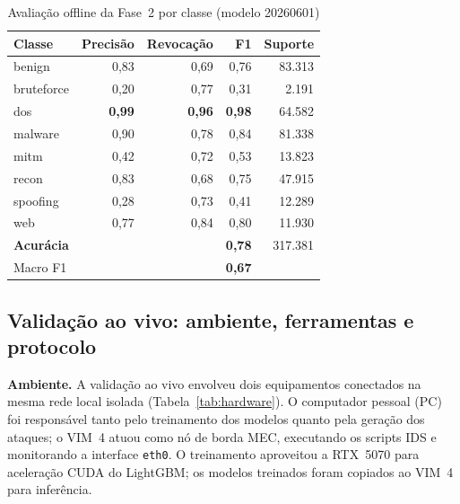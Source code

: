 \documentclass[12pt]{article}
\begin{document}
\begin{table}[ht]
\centering
\caption{Avaliação offline da Fase~2 por classe (modelo 20260601)}
\label{tab:phase2_offline}
\begin{tabular}{@{}lrrrr@{}}
\toprule
\textbf{Classe} & \textbf{Precisão} & \textbf{Revocação} & \textbf{F1} & \textbf{Suporte} \\ \midrule
benign      & 0,83 & 0,69 & 0,76 & 83.313 \\
bruteforce  & 0,20 & 0,77 & 0,31 &  2.191 \\
dos         & \textbf{0,99} & \textbf{0,96} & \textbf{0,98} & 64.582 \\
malware     & 0,90 & 0,78 & 0,84 & 81.338 \\
mitm        & 0,42 & 0,72 & 0,53 & 13.823 \\
recon       & 0,83 & 0,68 & 0,75 & 47.915 \\
spoofing    & 0,28 & 0,73 & 0,41 & 12.289 \\
web         & 0,77 & 0,84 & 0,80 & 11.930 \\ \midrule
\textbf{Acurácia} & & & \textbf{0,78} & 317.381 \\
Macro F1    & & & \textbf{0,67} & \\
\bottomrule
\end{tabular}
\end{table}

\subsection{Validação ao vivo: ambiente, ferramentas e protocolo}
\label{subsec:validacao}

\textbf{Ambiente.} A validação ao vivo envolveu dois equipamentos conectados na
mesma rede local isolada (Tabela~\ref{tab:hardware}). O computador pessoal (PC)
foi responsável tanto pelo treinamento dos modelos quanto pela geração dos
ataques; o VIM~4 atuou como nó de borda MEC, executando os scripts IDS e
monitorando a interface \texttt{eth0}. O treinamento aproveitou a RTX~5070 para
aceleração CUDA do LightGBM; os modelos treinados foram copiados ao VIM~4 para
inferência.
\end{document}
